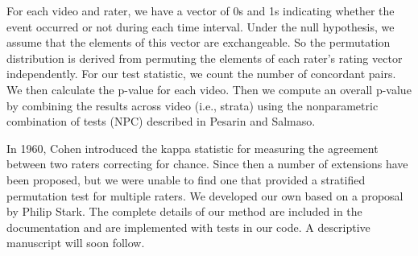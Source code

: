 For each video and rater, we have a vector of 0s and 1s indicating whether the
event occurred or not during each time interval.  Under the null hypothesis, we
assume that the elements of this vector are exchangeable.  So the permutation
distribution is derived from permuting the elements of each rater's rating
vector independently.  For our test statistic, we count the number of
concordant pairs.  We then calculate the p-value for each video.  Then we
compute an overall p-value by combining the results across video (i.e., strata)
using the nonparametric combination of tests (NPC) described in Pesarin and
Salmaso.

In 1960, Cohen \cite{cohen1960} introduced the kappa statistic for measuring
the agreement between two raters correcting for chance.  Since then a number of
extensions have been proposed, but we were unable to find one that provided a
stratified permutation test for multiple raters. We developed our own based on
a proposal by Philip Stark. The complete details of our method are included in
the documentation and are implemented with tests in our code.  A descriptive
manuscript will soon follow.

